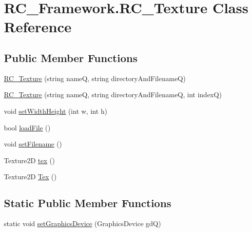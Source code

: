\hypertarget{class_r_c___framework_1_1_r_c___texture}{}\section{R\+C\+\_\+\+Framework.\+R\+C\+\_\+\+Texture Class Reference}
\label{class_r_c___framework_1_1_r_c___texture}
\subsection*{Public Member Functions}
\begin{DoxyCompactItemize}
\item 
\mbox{\hyperlink{class_r_c___framework_1_1_r_c___texture_a0c6c13c129ff5e69506a72f11f774f63}{R\+C\+\_\+\+Texture}} (string nameQ, string directory\+And\+FilenameQ)
\item 
\mbox{\hyperlink{class_r_c___framework_1_1_r_c___texture_a441e4cb3d98d016c897b3d897ddbcb1d}{R\+C\+\_\+\+Texture}} (string nameQ, string directory\+And\+FilenameQ, int indexQ)
\item 
void \mbox{\hyperlink{class_r_c___framework_1_1_r_c___texture_afa209ab1b5aa0f31309b1476296954ef}{set\+Width\+Height}} (int w, int h)
\item 
bool \mbox{\hyperlink{class_r_c___framework_1_1_r_c___texture_aafec28028905c5864b9a71b7cb19882c}{load\+File}} ()
\item 
void \mbox{\hyperlink{class_r_c___framework_1_1_r_c___texture_a8fec28881bf93c9e2095800b1f59fe2b}{set\+Filename}} ()
\item 
Texture2D \mbox{\hyperlink{class_r_c___framework_1_1_r_c___texture_a41ab7bdcc1a43960fde61e4e8d05f506}{tex}} ()
\item 
Texture2D \mbox{\hyperlink{class_r_c___framework_1_1_r_c___texture_a5518e74f8fe6031830dfac12fb34e531}{Tex}} ()
\end{DoxyCompactItemize}
\subsection*{Static Public Member Functions}
\begin{DoxyCompactItemize}
\item 
static void \mbox{\hyperlink{class_r_c___framework_1_1_r_c___texture_a3d92372e45bb35d42dc5466fde6941c7}{set\+Graphics\+Device}} (Graphics\+Device gdQ)
\end{DoxyCompactItemize}
